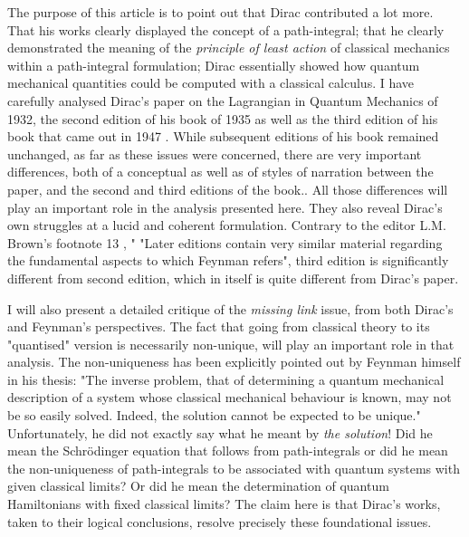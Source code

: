 \documentclass[a4paper]{JHEP3}
\begin{document}
The purpose of this article is to point out that Dirac contributed a lot more. That his works clearly displayed the concept of a path-integral;
that he clearly demonstrated the meaning of the {\it principle of least action} of classical mechanics within a path-integral formulation; Dirac
essentially showed how quantum mechanical quantities could be computed with a classical calculus. I have carefully analysed Dirac's paper on the
Lagrangian in Quantum Mechanics of 1932, the second edition of his book of 1935 \cite{diracbook2} as well as the third edition of his book that came 
out in 1947 \cite{diracbook3}.
While subsequent editions of his book remained unchanged, as far as these issues were concerned, there are very important differences, both
of a conceptual as well as of styles of narration between the paper, and the second and third editions of the book.. All those differences will play an important role in the analysis presented here. They
also reveal Dirac's own struggles at a lucid and coherent formulation. Contrary to the editor L.M. Brown's footnote 13 \cite{thesis}, "
"Later editions contain very similar material regarding the
fundamental aspects to which Feynman refers", third edition is significantly different from second edition, which in itself is quite different
from Dirac's paper.

I will also present a detailed critique of the {\it missing link} issue, from both Dirac's and Feynman's perspectives. The fact that going 
from classical theory to its "quantised" version is necessarily non-unique, will play an important role in that analysis. The non-uniqueness
 has been explicitly pointed out by Feynman himself in his thesis: 
"The inverse problem, that of determining a quantum mechanical
description of a system whose classical mechanical behaviour is
known, may not be so easily solved. Indeed, the solution cannot be
expected to be unique." Unfortunately, he did not exactly say what he meant by \emph{the solution}! Did he mean the Schr\"odinger equation
that follows from path-integrals or did he mean the non-uniqueness of path-integrals to be associated with quantum systems with given
classical limits? Or did he mean the determination of quantum Hamiltonians with fixed classical limits? The claim here is that Dirac's
works, taken to their logical conclusions, resolve precisely these foundational issues.
\end{document}
